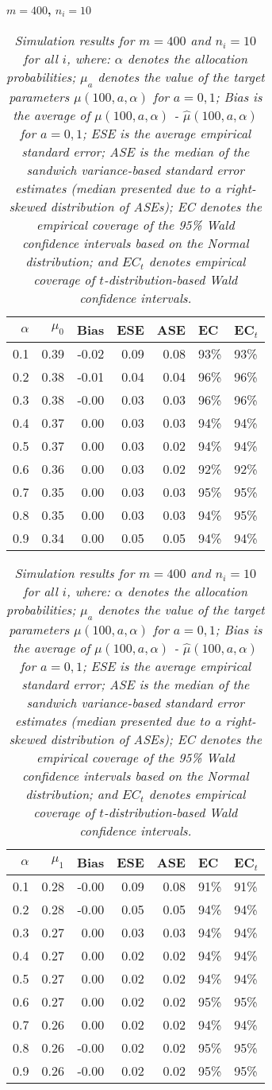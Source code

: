 \documentclass[12pt, letterpaper]{article}
\begin{document}
\begin{center}
	\textbf{$m=400$, $n_i=10$} 
\end{center}
\begin{table}[ht!]
	\centering
	\bgroup
	\def\arraystretch{1.25}
	\setlength\tabcolsep{0.05in}
	\begin{tabular}{rrrrrll}
		\hline
		$\alpha$ & $\mu_0$ & Bias & ESE & ASE & EC & EC$_t$ \\ 
				\hline
		0.1 & 0.39 & -0.02 & 0.09 & 0.08 & 93\% & 93\% \\ 
		0.2 & 0.38 & -0.01 & 0.04 & 0.04 & 96\% & 96\% \\ 
		0.3 & 0.38 & -0.00 & 0.03 & 0.03 & 96\% & 96\% \\ 
		0.4 & 0.37 & 0.00 & 0.03 & 0.03 & 94\% & 94\% \\ 
		0.5 & 0.37 & 0.00 & 0.03 & 0.02 & 94\% & 94\% \\ 
		0.6 & 0.36 & 0.00 & 0.03 & 0.02 & 92\% & 92\% \\ 
		0.7 & 0.35 & 0.00 & 0.03 & 0.03 & 95\% & 95\% \\ 
		0.8 & 0.35 & 0.00 & 0.03 & 0.03 & 94\% & 95\% \\ 
		0.9 & 0.34 & 0.00 & 0.05 & 0.05 & 94\% & 94\% \\ 
		\hline
	\end{tabular}
	\egroup
	\quad 
	\bgroup
	\setlength\tabcolsep{0.05in}
	\def\arraystretch{1.25}
	\begin{tabular}{rrrrrll}
		\hline
		$\alpha$ & $\mu_1$ & Bias & ESE & ASE & EC & EC$_t$ \\
				\hline 
		0.1 & 0.28 & -0.00 & 0.09 & 0.08 & 91\% & 91\% \\ 
		0.2 & 0.28 & -0.00 & 0.05 & 0.05 & 94\% & 94\% \\ 
		0.3 & 0.27 & 0.00 & 0.03 & 0.03 & 94\% & 94\% \\ 
		0.4 & 0.27 & 0.00 & 0.02 & 0.02 & 94\% & 94\% \\ 
		0.5 & 0.27 & 0.00 & 0.02 & 0.02 & 94\% & 94\% \\ 
		0.6 & 0.27 & 0.00 & 0.02 & 0.02 & 95\% & 95\% \\ 
		0.7 & 0.26 & 0.00 & 0.02 & 0.02 & 94\% & 94\% \\ 
		0.8 & 0.26 & -0.00 & 0.02 & 0.02 & 95\% & 95\% \\ 
		0.9 & 0.26 & -0.00 & 0.02 & 0.02 & 95\% & 95\% \\  
		\hline
	\end{tabular}
	\egroup
	\caption*{\textit{Simulation results for $m = 400$ and $n_i = 10$ for all $i$, where: $\alpha$ denotes the allocation probabilities; $\mu_a$ denotes the value of the target parameters $\mu(100, a, \alpha)$ for $a=0,1$; Bias is the average of $\mu(100, a, \alpha)$ - $\hat{\mu}(100, a, \alpha)$ for $a=0, 1$; ESE is the average empirical standard error; ASE is the median of the sandwich variance-based standard error estimates (median presented due to a right-skewed distribution of ASEs); EC denotes the empirical coverage of the 95\% Wald confidence intervals based on the Normal distribution; and $EC_t$ denotes empirical coverage of $t$-distribution-based Wald confidence intervals.}}
\end{table}
\end{document}
